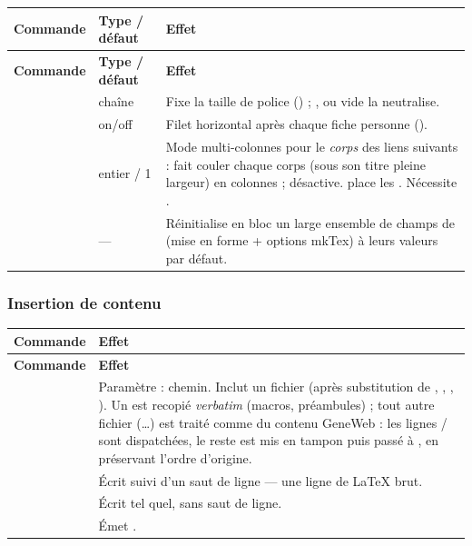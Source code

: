 \begin{longtable}{C T F}
\toprule
\textbf{Commande} & \textbf{Type / défaut} & \textbf{Effet} \\
\midrule
\endfirsthead
\toprule
\textbf{Commande} & \textbf{Type / défaut} & \textbf{Effet} \\
\midrule
\endhead
\bottomrule
\endfoot

 & chaîne & Fixe la taille de police () ; ,
 ou vide la neutralise. \\
\addlinespace

 & on/off & Filet horizontal après chaque fiche personne
(). \\
\addlinespace

 & entier / 1 & Mode multi-colonnes pour le \emph{corps} des liens
 suivants :  fait couler chaque corps (sous son titre
pleine largeur) en  colonnes ;  désactive. 
place les . Nécessite
. \\
\addlinespace

 & — & Réinitialise en bloc un large ensemble de champs de
 (mise en forme + options mkTex) à leurs valeurs par défaut. \\
\end{longtable}

\subsubsection*{Insertion de contenu}

\begin{longtable}{C E}
\toprule
\textbf{Commande} & \textbf{Effet} \\
\midrule
\endfirsthead
\toprule
\textbf{Commande} & \textbf{Effet} \\
\midrule
\endhead
\bottomrule
\endfoot

 & Paramètre : chemin. Inclut un fichier (après substitution de
, , ,
). Un  est recopié \emph{verbatim} (macros,
préambules) ; tout autre fichier (\ldots) est traité comme du contenu
GeneWeb : les lignes / sont dispatchées, le
reste est mis en tampon puis passé à , en préservant l'ordre
d'origine. \\
\addlinespace

 & Écrit  suivi d'un saut de ligne — une ligne de
LaTeX brut. \\
\addlinespace

 & Écrit  tel quel, sans saut de ligne. \\
\addlinespace

 & Émet . \\
\end{longtable}

